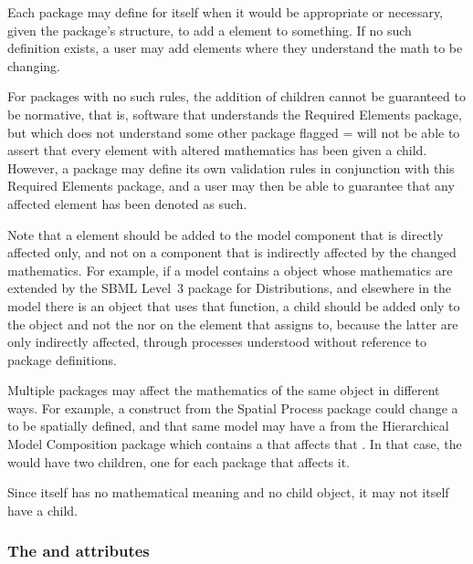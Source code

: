 Each package may define for itself when it would be appropriate or necessary, given the package's structure, to add a \MathChangedClaim element to something.  If no such definition exists, a user may add \MathChangedClaim elements where they understand the math to be changing.

For packages with no such rules, the addition of \MathChangedClaim children cannot be guaranteed to be normative, that is, software that understands the Required Elements package, but which does not understand some other package flagged = will not be able to assert that every element with altered mathematics has been given a \MathChangedClaim child.  However, a package may define its own validation rules in conjunction with this Required Elements package, and a user may then be able to guarantee that any affected element has been denoted as such.

Note that a \MathChangedClaim element should be added to the model component that is directly affected only, and not on a component that is indirectly affected by the changed mathematics.  For example, if a model contains a \FunctionDefinition object whose mathematics are extended by the SBML Level~3 package for Distributions, and elsewhere in the model there is an \InitialAssignment object that uses that function, a \MathChangedClaim child should be added only to the \FunctionDefinition object and not the \InitialAssignment nor on the element that assigns to, because the latter are only indirectly affected, through processes understood without reference to package definitions.

Multiple packages may affect the mathematics of the same object in different ways.  For example, a construct from the Spatial Process package could change a \Species to be spatially defined, and that same model may have a \Submodel from the Hierarchical Model Composition package which contains a \Reaction that affects that \Species.  In that case, the \Species would have two \MathChangedClaim children, one for each package that affects it.

Since \MathChangedClaim itself has no mathematical meaning and no child \Math object, it may not itself have a \MathChangedClaim child.

\subsubsection{The \fixttspace{} and \fixttspace{} attributes}
\label{idname-attributes}

